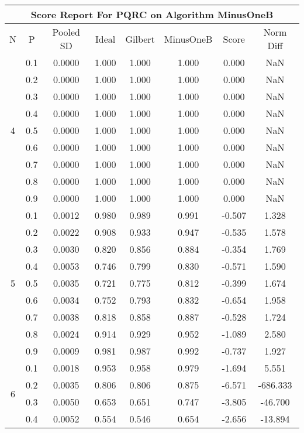 \documentclass[11pt,a4paper]{report}
\begin{document}
\begin{longtable}{ | c | c || c | c | c | c | c | c | }
\hline
\multicolumn{8}{|c|}{ Score Report For PQRC on Algorithm MinusOneB} \\
\hline
N & P & Pooled SD &  Ideal &  Gilbert & MinusOneB  & Score & Norm Diff \\
 \hline
 \hline
 \endhead
\multirow{9}{*}{4} & 0.1 & 0.0000 & 1.000 & 1.000 & 1.000 & 0.000 & NaN \\
 & 0.2 & 0.0000 & 1.000 & 1.000 & 1.000 & 0.000 & NaN \\
 & 0.3 & 0.0000 & 1.000 & 1.000 & 1.000 & 0.000 & NaN \\
 & 0.4 & 0.0000 & 1.000 & 1.000 & 1.000 & 0.000 & NaN \\
 & 0.5 & 0.0000 & 1.000 & 1.000 & 1.000 & 0.000 & NaN \\
 & 0.6 & 0.0000 & 1.000 & 1.000 & 1.000 & 0.000 & NaN \\
 & 0.7 & 0.0000 & 1.000 & 1.000 & 1.000 & 0.000 & NaN \\
 & 0.8 & 0.0000 & 1.000 & 1.000 & 1.000 & 0.000 & NaN \\
 & 0.9 & 0.0000 & 1.000 & 1.000 & 1.000 & 0.000 & NaN \\
 \hline
\multirow{9}{*}{5} & 0.1 & 0.0012 & 0.980 & 0.989 & 0.991 & -0.507 & 1.328 \\
 & 0.2 & 0.0022 & 0.908 & 0.933 & 0.947 & -0.535 & 1.578 \\
 & 0.3 & 0.0030 & 0.820 & 0.856 & 0.884 & -0.354 & 1.769 \\
 & 0.4 & 0.0053 & 0.746 & 0.799 & 0.830 & -0.571 & 1.590 \\
 & 0.5 & 0.0035 & 0.721 & 0.775 & 0.812 & -0.399 & 1.674 \\
 & 0.6 & 0.0034 & 0.752 & 0.793 & 0.832 & -0.654 & 1.958 \\
 & 0.7 & 0.0038 & 0.818 & 0.858 & 0.887 & -0.528 & 1.724 \\
 & 0.8 & 0.0024 & 0.914 & 0.929 & 0.952 & -1.089 & 2.580 \\
 & 0.9 & 0.0009 & 0.981 & 0.987 & 0.992 & -0.737 & 1.927 \\
 \hline
\multirow{9}{*}{6} & 0.1 & 0.0018 & 0.953 & 0.958 & 0.979 & -1.694 & 5.551 \\
 & 0.2 & 0.0035 & 0.806 & 0.806 & 0.875 & -6.571 & -686.333 \\
 & 0.3 & 0.0050 & 0.653 & 0.651 & 0.747 & -3.805 & -46.700 \\
 & 0.4 & 0.0052 & 0.554 & 0.546 & 0.654 & -2.656 & -13.894 \\

\end{longtable}
\end{document}

